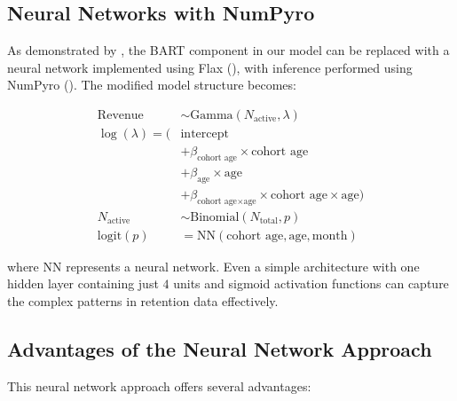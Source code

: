 \documentclass[11pt]{amsart}
\theoremstyle{definition}
\begin{document}
\subsection{Neural Networks with NumPyro}

As demonstrated by \cite{orduz_revenue_retention_numpyro}, the BART component in our model can be replaced with a neural
network implemented using Flax (\cite{flax2020github}), with inference performed using NumPyro (\cite{phan2019composable}). The modified model
structure becomes:

\begin{align*}
    \text{Revenue}    & \sim \text{Gamma}(N_{\text{active}}, \lambda)                                             \\
    \log(\lambda) = ( & \text{intercept}                                                                          \\
                      & + \beta_{\text{cohort age}} \times \text{cohort age}                                      \\
                      & + \beta_{\text{age}} \times \text{age}                                                    \\
                      & + \beta_{\text{cohort age} \times \text{age}} \times \text{cohort age} \times \text{age}) \\
    N_{\text{active}} & \sim \text{Binomial}(N_{\text{total}}, p)                                                 \\
    \textrm{logit}(p) & = \text{NN}(\text{cohort age}, \text{age}, \text{month})
\end{align*}

where $\text{NN}$ represents a neural network. Even a simple architecture with one hidden layer containing just $4$ units and
sigmoid activation functions can capture the complex patterns in retention data effectively.

\subsection{Advantages of the Neural Network Approach}

This neural network approach offers several advantages:
\end{document}
